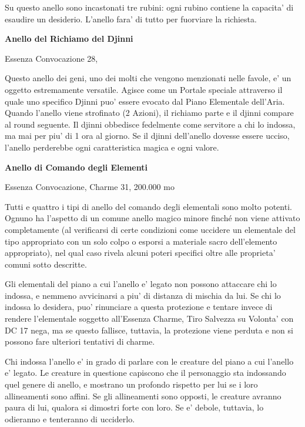 \documentclass[a4paper,11pt,twoside,openany]{book}
\begin{document}
{		Su questo anello sono incastonati tre rubini: ogni rubino contiene la capacita' di esaudire un desiderio. L'anello fara' di tutto per fuorviare la richiesta.
		
		\textbf{Anello del Richiamo del Djinni}
		
		Essenza Convocazione 28,
		
		Questo anello dei geni, uno dei molti che vengono menzionati nelle favole, e' un oggetto estremamente versatile. Agisce come un Portale speciale attraverso il quale uno specifico Djinni puo' essere evocato dal Piano Elementale dell'Aria. Quando l'anello viene strofinato (2 Azioni), il richiamo parte e il djinni compare al round seguente. Il djinni obbedisce fedelmente come servitore a chi lo indossa, ma mai per piu' di 1 ora al giorno. Se il djinni dell'anello dovesse essere ucciso, l'anello perderebbe ogni caratteristica magica e ogni valore.
		
		\textbf{Anello di Comando degli Elementi}
		
		Essenza Convocazione, Charme 31, 200.000 mo
		
		Tutti e quattro i tipi di anello del comando degli elementali sono molto potenti. Ognuno ha l'aspetto di un comune anello magico minore finché non viene attivato completamente (al verificarsi di certe condizioni come uccidere un elementale del tipo appropriato con un solo colpo o esporsi a materiale sacro dell'elemento appropriato), nel qual caso rivela alcuni poteri specifici oltre alle proprieta' comuni sotto descritte.
		
		Gli elementali del piano a cui l'anello e' legato non possono attaccare chi lo indossa, e nemmeno avvicinarsi a piu' di distanza di mischia da lui. Se chi lo indossa lo desidera, puo' rinunciare a questa protezione e tentare invece di rendere l'elementale soggetto all'Essenza Charme, Tiro Salvezza su Volonta' con DC 17 nega, ma se questo fallisce, tuttavia, la protezione viene perduta e non si possono fare ulteriori tentativi di charme.
		
		Chi indossa l'anello e' in grado di parlare con le creature del piano a cui l'anello e' legato. Le creature in questione capiscono che il personaggio sta indossando quel genere di anello, e mostrano un profondo rispetto per lui se i loro allineamenti sono affini. Se gli allineamenti sono opposti, le creature avranno paura di lui, qualora si dimostri forte con loro. Se e' debole, tuttavia, lo odieranno e tenteranno di ucciderlo.
		
}
\end{document}
